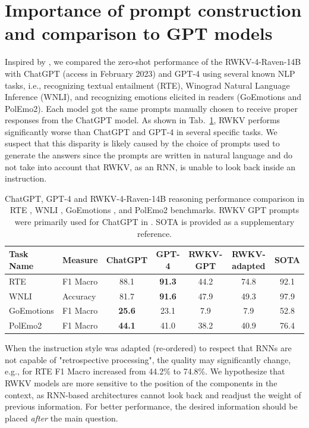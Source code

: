 \documentclass[11pt]{article}
\begin{document}
\section{Importance of prompt construction and comparison to GPT models}
\label{appendix:promptImportanceAndRWKVvsGPT}

Inspired by \citet{kocon2023chatgpt}, we compared the zero-shot performance of the RWKV-4-Raven-14B with ChatGPT (access in February 2023) and GPT-4 using several known NLP tasks, i.e., recognizing textual entailment (RTE), Winograd Natural Language Inference (WNLI), and recognizing emotions elicited in readers (GoEmotions and PolEmo2). 
Each model got the same prompts manually chosen to receive proper responses from the ChatGPT model. As shown in Tab.~\ref{tab:RWKVvsChaGPTvsGPT4}, RWKV performs significantly worse than ChatGPT and GPT-4 in several specific tasks. We suspect that this disparity is likely caused by the choice of prompts used to generate the answers since the prompts are written in natural language and do not take into account that RWKV, as an RNN, is unable to look back inside an instruction. 

\begin{table}
\centering
\begin{tabular}{llccccc}
\toprule
  Task Name      & Measure &  ChatGPT & GPT-4    & RWKV-GPT & RWKV-adapted & SOTA\\
\midrule
   RTE  & F1 Macro &  88.1 & \textbf{91.3} & 44.2 & 74.8 & 92.1\\
   WNLI  & Accuracy &  81.7 & \textbf{91.6} & 47.9 & 49.3 & 97.9\\
   GoEmotions  & F1 Macro & \textbf{25.6} & 23.1 & 7.9 & 7.9 & 52.8\\
   PolEmo2 & F1 Macro & \textbf{44.1} & 41.0 & 38.2 & 40.9 & 76.4\\
\bottomrule 
\end{tabular}
\caption{ChatGPT, GPT-4 and RWKV-4-Raven-14B reasoning performance comparison in RTE \cite{SuperGLUE}, WNLI \cite{wang-etal-2018-glue}, GoEmotions \cite{GoEmotions}, and PolEmo2 \cite{kocon2019multi} benchmarks. RWKV GPT prompts were primarily used for ChatGPT in \cite{kocon2023chatgpt}. SOTA is provided as a supplementary reference.}
\label{tab:RWKVvsChaGPTvsGPT4}
\end{table}


When the instruction style was adapted (re-ordered) to respect that RNNs are not capable of "retrospective processing", the quality may significantly change, e.g., for RTE \cite{SuperGLUE} F1 Macro increased from 44.2\% to 74.8\%. We hypothesize that RWKV models are more sensitive to the position of the components in the context, as RNN-based architectures cannot look back and readjust the weight of previous information. For better performance, the desired information should be placed \textit{after} the main question. 
\end{document}
